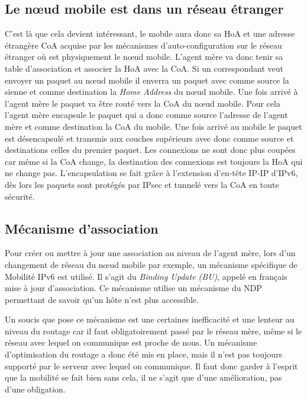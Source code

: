
\subsection{Le nœud mobile est dans un réseau étranger}

C’est là que cela devient intéressant, le mobile aura donc sa HoA et une adresse étrangère CoA acquise par les mécanismes d’auto-configuration sur le réseau étranger où est physiquement le nœud mobile.
L’agent mère va donc tenir sa table d’association et associer la HoA avec la CoA.
Si un correspondant veut envoyer un paquet au nœud mobile il enverra un paquet avec comme source la sienne et comme destination la \emph{Home Address} du nœud mobile.
Une fois arrivé à l’agent mère le paquet va être routé vers la CoA du nœud mobile.
Pour cela l’agent mère encapsule le paquet qui a donc comme source l’adresse de l’agent mère et comme destination la CoA du mobile.
Une fois arrivé au mobile le paquet est désencapsulé et transmis aux couches supérieurs avec donc comme source et destinations celles du premier paquet.
Les connexions ne sont donc plus coupées car même si la CoA change, la destination des connexions est toujours la HoA qui ne change pas.
L’encapsulation se fait grâce à l’extension d’en-tête IP-IP d’IPv6, dès lors les paquets sont protégés par IPsec et tunnelé vers la CoA en toute sécurité.


\subsection{Mécanisme d’association}

Pour créer ou mettre à jour une association au niveau de l’agent mère, lors d’un changement de réseau du nœud mobile par exemple, un mécanisme spécifique de Mobilité IPv6 est utilisé.
Il s’agit du \emph{Binding Update (BU)}, appelé en français mise à jour d’association.
Ce mécanisme utilise un mécanisme du NDP permettant de savoir qu’un hôte n’est plus accessible.


Un soucis que pose ce mécanisme est une certaines inefficacité et une lenteur au niveau du routage car il faut obligatoirement passé par le réseau mère, même si le réseau avec lequel on communique est proche de nous.
Un mécanisme d’optimisation du routage a donc été mis en place, mais il n’est pas toujours supporté par le serveur avec lequel on communique.
Il faut donc garder à l’esprit que la mobilité se fait bien sans cela, il ne s’agit que d’une amélioration, pas d’une obligation.


